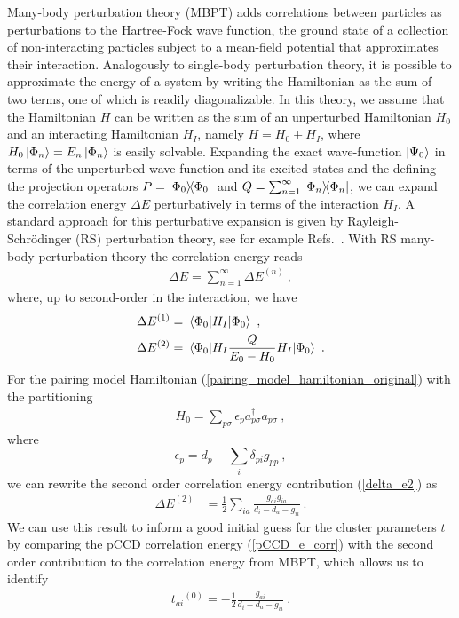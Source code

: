 \documentclass[aps,pre,floatfix,showpacs,twocolumn, preprintnumbers]{revtex4-1}
\begin{document}
Many-body perturbation theory (MBPT) \cite{Paldus2006,shavittbartlett2009,morten_book} adds correlations between particles as perturbations to the Hartree-Fock wave function, the ground state of a collection of non-interacting particles subject to a mean-field potential that approximates their interaction. Analogously to single-body perturbation theory, it is possible to approximate the energy of a system by writing the Hamiltonian as the sum of two terms, one of which is readily diagonalizable. In this theory, we assume that the Hamiltonian $H$ can be written as the sum of an unperturbed Hamiltonian $H_0$ and an interacting Hamiltonian $H_I$, namely $H=H_0+H_I$, where $H_0\ket{\Phi_n}=E_n\ket{\Phi_n}$ is easily solvable.
Expanding the exact wave-function $\ket{\Psi_0}$ in terms of the unperturbed wave-function and its excited states and the defining the projection operators
$P=\ketbra{\Phi_0}$ and $Q=\sum_{n=1}^\infty\ketbra{\Phi_n}$, we can expand the correlation energy $\Delta E$ perturbatively in terms of the interaction $H_I$. A standard approach for this perturbative expansion is given by Rayleigh-Schr\"odinger (RS) perturbation theory, see for example Refs.~\cite{Paldus2006,shavittbartlett2009,morten_book}.
With RS many-body perturbation theory the correlation energy reads
\begin{align}
\label{e_sum}
\Delta E=\sum_{n=1}^\infty \Delta E^{(n)}\ ,
\end{align}
where, up to second-order in the interaction, we have
\begin{align}
\label{delta_e1}
\Delta E^{(1)}
=& \ 
\mel{\Phi_0}{H_I}{\Phi_0}\ ,
\\
\label{delta_e2}
\Delta E^{(2)}
=& \ 
\mel{\Phi_0}{H_I\frac{Q}{E_0-H_0}H_I}{\Phi_0}\ .
\end{align}
For the pairing model Hamiltonian (\ref{pairing_model_hamiltonian_original})
with the partitioning 
\begin{align}
\label{h0_hf}
H_0
=
\sum_{p\sigma}\epsilon_p a^\dagger_{p\sigma}a_{p\sigma}
\ ,
\end{align}
where
\begin{equation}
\epsilon_p = d_p-\sum_i\delta_{pi}g_{pp}\ ,
\end{equation}
we can rewrite the second order correlation energy contribution (\ref{delta_e2}) as
\begin{align}
\label{pairing_delta_e2}
\Delta E^{(2)}
&=
\frac{1}{2}\sum_{ia}\frac{g_{ai}g_{ia}}{d_i-d_a-g_{ii}}\ .
\end{align}
We can use this result to inform a good initial guess for the cluster parameters $t$ by comparing the pCCD correlation energy (\ref{pCCD_e_corr}) with the second order contribution to the correlation energy from MBPT, which allows us to identify
\begin{align}
\label{t_init}
{t_{ai}}^{(0)}
=
-\frac{1}{2}\frac{g_{ai}}{d_i-d_a-g_{ii}}\ .
\end{align}
\end{document}
